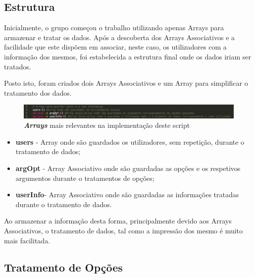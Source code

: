 \documentclass[10pt,portuguese]{article}
\begin{document}
\subsection{Estrutura}
\par Inicialmente, o grupo começou o trabalho utilizando apenas Arrays para armazenar e tratar os dados. Após a descoberta dos Arrays Associativos e a facilidade que este dispõem em associar, neste caso, os utilizadores com a informação dos mesmos, foi estabelecida a estrutura final onde os dados iriam ser tratados.
\par Posto isto, foram criados dois Arrays Associativos e um Array para simplificar o tratamento dos dados.

\begin{figure}[!h]
    \centering
    \includegraphics[width=\textwidth]{estrutura.png}
    \caption{\textbf{\textit{Arrays}} mais relevantes na implementação deste script}
\end{figure}
\newline
 \begin{itemize}
   \item {\textbf{users}}   - Array onde são guardados os utilizadores, sem repetição, durante o tratamento de dados;
   \\
   \item {\textbf{argOpt}}  - Array Associativo onde são guardadas as opções e os respetivos argumentos durante o tratamentos de opções;
   \\
   \item {\textbf{userInfo}}- Array Associativo onde são guardadas as informações tratadas durante o tratamento de dados.
 \end{itemize}
\newline
 \par Ao armazenar a informação desta forma, principalmente devido aos Arrays Associativos, o tratamento de dados, tal como a impressão dos mesmo é muito mais facilitada.

\clearpage

\subsection{Tratamento de Opções}
\end{document}

